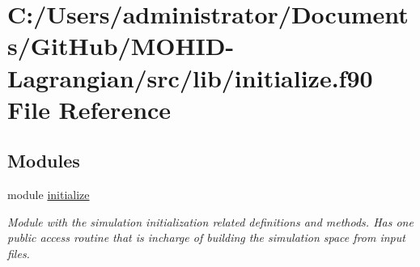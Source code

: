 \hypertarget{initialize_8f90}{}\section{C\+:/\+Users/administrator/\+Documents/\+Git\+Hub/\+M\+O\+H\+I\+D-\/\+Lagrangian/src/lib/initialize.f90 File Reference}
\label{initialize_8f90}
\subsection*{Modules}
\begin{DoxyCompactItemize}
\item 
module \hyperlink{namespaceinitialize}{initialize}
\begin{DoxyCompactList}\small\item\em Module with the simulation initialization related definitions and methods. Has one public access routine that is incharge of building the simulation space from input files. \end{DoxyCompactList}\end{DoxyCompactItemize}
